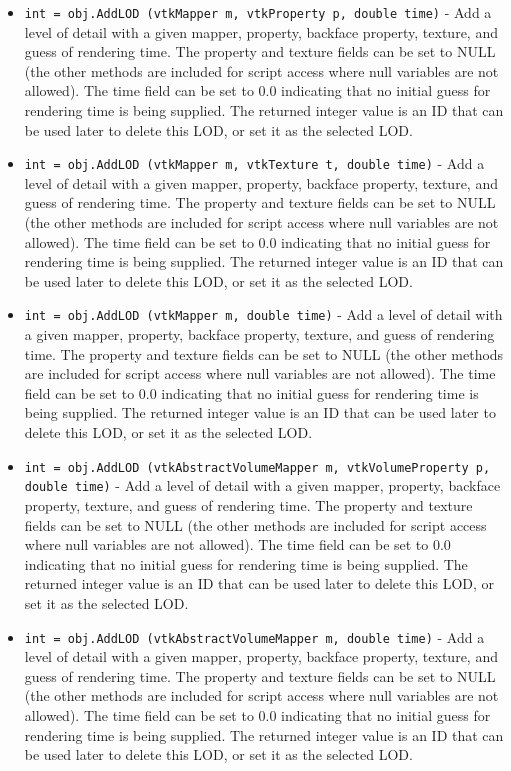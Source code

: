 \begin{itemize}
\item  \verb|int = obj.AddLOD (vtkMapper m, vtkProperty p, double time)| -  Add a level of detail with a given mapper, property, backface property,
 texture, and guess of rendering time.  The property and texture fields
 can be set to NULL (the other methods are included for script access
 where null variables are not allowed). The time field can be set to 0.0
 indicating that no initial guess for rendering time is being supplied.
 The returned integer value is an ID that can be used later to delete
 this LOD, or set it as the selected LOD.

\item  \verb|int = obj.AddLOD (vtkMapper m, vtkTexture t, double time)| -  Add a level of detail with a given mapper, property, backface property,
 texture, and guess of rendering time.  The property and texture fields
 can be set to NULL (the other methods are included for script access
 where null variables are not allowed). The time field can be set to 0.0
 indicating that no initial guess for rendering time is being supplied.
 The returned integer value is an ID that can be used later to delete
 this LOD, or set it as the selected LOD.

\item  \verb|int = obj.AddLOD (vtkMapper m, double time)| -  Add a level of detail with a given mapper, property, backface property,
 texture, and guess of rendering time.  The property and texture fields
 can be set to NULL (the other methods are included for script access
 where null variables are not allowed). The time field can be set to 0.0
 indicating that no initial guess for rendering time is being supplied.
 The returned integer value is an ID that can be used later to delete
 this LOD, or set it as the selected LOD.

\item  \verb|int = obj.AddLOD (vtkAbstractVolumeMapper m, vtkVolumeProperty p, double time)| -  Add a level of detail with a given mapper, property, backface property,
 texture, and guess of rendering time.  The property and texture fields
 can be set to NULL (the other methods are included for script access
 where null variables are not allowed). The time field can be set to 0.0
 indicating that no initial guess for rendering time is being supplied.
 The returned integer value is an ID that can be used later to delete
 this LOD, or set it as the selected LOD.

\item  \verb|int = obj.AddLOD (vtkAbstractVolumeMapper m, double time)| -  Add a level of detail with a given mapper, property, backface property,
 texture, and guess of rendering time.  The property and texture fields
 can be set to NULL (the other methods are included for script access
 where null variables are not allowed). The time field can be set to 0.0
 indicating that no initial guess for rendering time is being supplied.
 The returned integer value is an ID that can be used later to delete
 this LOD, or set it as the selected LOD.


\end{itemize}
